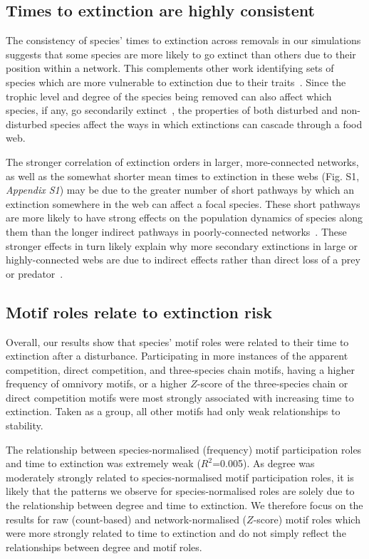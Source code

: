 \documentclass[12pt]{article}
\begin{document}
\begin{spacing}{2.0}
 	\subsection*{Times to extinction are highly consistent}

		The consistency of species' times to extinction across removals in our simulations suggests that some species are more likely to go extinct than others due to their position within a network.
        This complements other work identifying sets of species which are more vulnerable to extinction due to their traits~\citep{Curtsdotter2011,Ryser2019}. 
		Since the trophic level and degree of the species being removed can also affect which species, if any, go secondarily extinct~\citep{Wootton2016a,Dunne2002}, the properties of both disturbed and non-disturbed species affect the ways in which extinctions can cascade through a food web.
		
		
		The stronger correlation of extinction orders in larger, more-connected networks, as well as the somewhat shorter mean times to extinction in these webs (Fig. S1, \emph{Appendix S1}) may be due to the greater number of short pathways by which an extinction somewhere in the web can affect a focal species. 
		These short pathways are more likely to have strong effects on the population dynamics of species along them than the longer indirect pathways in poorly-connected networks~\citep{Jordan2002,Jordan2006}.
		These stronger effects in turn likely explain why more secondary extinctions in large or highly-connected webs are due to indirect effects rather than direct loss of a prey or predator~\citep{Wootton2016a}. 


	\subsection*{Motif roles relate to extinction risk}

		Overall, our results show that species' motif roles were related to their time to extinction after a disturbance.
		Participating in more instances of the apparent competition, direct competition, and three-species chain motifs, having a higher frequency of omnivory motifs, or a higher $Z$-score of the three-species chain or direct competition motifs were most strongly associated with increasing time to extinction.
        Taken as a group, all other motifs had only weak relationships to stability.


        The relationship between species-normalised (frequency) motif participation roles and time to extinction was extremely weak ($R^2$=0.005).
        As degree was moderately strongly related to species-normalised motif participation roles, it is likely that the patterns we observe for species-normalised roles are solely due to the relationship between degree and time to extinction.
        We therefore focus on the results for raw (count-based) and network-normalised ($Z$-score) motif roles which were more strongly related to time to extinction and do not simply reflect the relationships between degree and motif roles.



\end{spacing}
\end{document}
